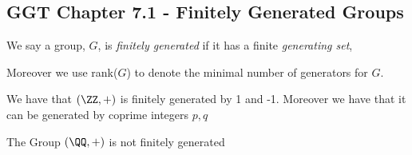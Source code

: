 \subsection{GGT Chapter 7.1 - Finitely Generated Groups}
    \begin{definition}
        We say a group, $G$, is \textit{finitely generated} if it has a finite \textit{generating set},
    \end{definition} 
    Moreover we use rank($G$) to denote the minimal number of generators for $G$.
    \begin{example}
        We have that $(\ZZ,+)$ is finitely generated by {1} and {-1}. Moreover we have that it can be generated by coprime integers {$p,q$}
    \end{example}
    \begin{example}
        The Group $(\QQ,+)$ is not finitely generated
    \end{example}
    \BBreak
